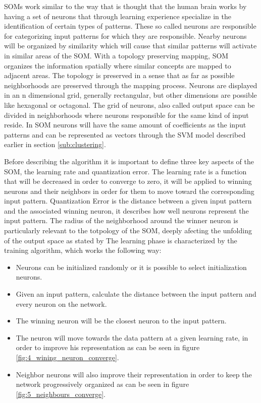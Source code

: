 SOMs work similar to the way that is thought that the human brain works by having a set of neurons that through learning experience specialize in the identification of certain types of patterns. These so called neurons are responsible for categorizing input patterns for which they are responsible. Nearby neurons will be organized by similarity which will cause that similar patterns will activate in similar areas of the SOM.
With a topology preserving mapping, SOM organizes the information spatially where similar concepts are mapped to adjacent areas. The topology is preserved in a sense that as far as possible neighborhoods are preserved through the mapping process.
Neurons are displayed in an n dimensional grid, generally rectangular, but other dimensions are possible like hexagonal or octagonal.  The grid of neurons, also called output space can be divided in neighborhoods where neurons responsible for the same kind of input reside.
In SOM neurons will have the same amount of coefficients as the input patterns and can be represented as vectors through the SVM model described earlier in section \ref{sub:clustering}.

Before describing the algorithm it is important to define three key aspects of the SOM, the learning rate and quantization error. The learning rate is a function that will be decreased in order to converge to zero, it will be applied to winning neurons and their neighbors in order for them to move toward the corresponding input pattern. Quantization Error is the distance between a given input pattern and the associated winning neuron, it describes how well neurons represent the input pattern. The radius of the neighborhood around the winner neuron is particularly relevant to the totpology of the SOM, deeply afecting the unfolding of the output space as stated by \citep{Bacao2005} 
The learning phase is characterized by the training algorithm, which works the following way:
\begin{itemize}
  \item Neurons can be initialized randomly or it is possible to select initialization neurons.
  \item Given an input pattern, calculate the distance between the input pattern and every neuron on the network.
  \item The winning neuron will be the closest neuron to the input pattern.
  \item The neuron will move towards the data pattern at a given learning rate, in order to improve his representation as can be seen in figure \ref{fig:4_wining_neuron_converge}.
  \item Neighbor neurons will also improve their representation in order to keep the network progressively organized as can be seen in figure \ref{fig:5_neighbours_converge}.
\end{itemize}

